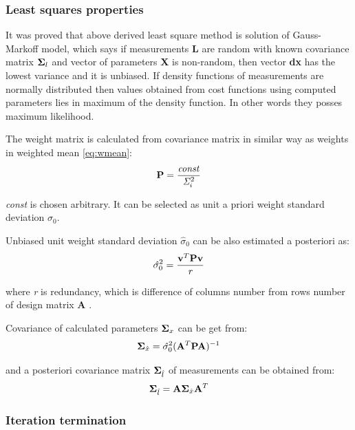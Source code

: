 \documentclass[a4paper,12pt]{article}
\newcommand{\ematr}[1]{
{\bf #1}
}
\newcommand{\evect}[1]{
{\bf #1}
}
\newcommand{\escal}[1]{
{\it #1}
}
\begin{document}
\subsubsection{Least squares properties}

It was proved \cite{mervart2007adjustment} that above derived least square method is solution of Gauss-Markoff model, which 
says if measurements \evect{L} are random with known covariance matrix $\ematr{\Sigma}_{l}$  and vector of parameters \evect{X} is non-random, then
vector \evect{dx}  has the lowest variance and it is unbiased. If density functions of measurements are normally 
distributed then values obtained from cost functions using  computed parameters lies in maximum of the density
function. In other words they posses maximum likelihood.

The weight matrix is calculated from covariance matrix in similar way as weights in weighted mean \eqref{eq:wmean}:
\begin{equation}
\ematr{P} = \frac{\escal{const}}{\escal{\Sigma}_{i}^{2}}
\end{equation} 

\escal{const} is chosen arbitrary. It can be selected as unit a priori weight standard deviation $\sigma_{0}$. 


Unbiased unit weight standard deviation $\hat{\sigma}_{0}$ can be also estimated a posteriori as:
\begin{equation}
\escal{\hat{\sigma}}_{0}^{2} = \frac{\evect{v}^{T} \ematr{P}  \evect{v}}{\escal{r}}
\end{equation} 

where \escal{r} is redundancy, which is difference of columns number from rows number of design matrix \ematr{A}.

Covariance of calculated parameters $\ematr{\Sigma}_{x}$ can be get from:
\begin{equation}
\ematr{\Sigma}_{\hat{x}} = \escal{\hat{\sigma}}_{0}^{2} (\ematr{A}^{T} \ematr{P} \ematr{A})^{-1}
\end{equation} 

and a posteriori covariance matrix $\ematr{\Sigma}_{\hat{l}}$ of measurements can be obtained from:
\begin{equation}
\ematr{\Sigma}_{\hat{l}} =  \ematr{A} \ematr{\Sigma}_{\hat{x}} \ematr{A}^{T}
\end{equation} 

\subsubsection{Iteration termination}
\end{document}
